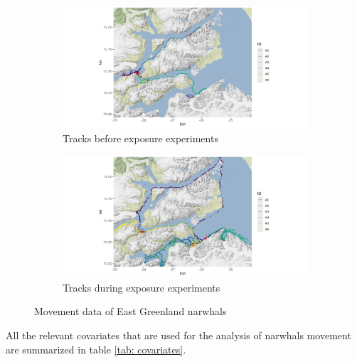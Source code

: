 \documentclass[11pt]{article}
\newcommand {\1}{\mathbb{1}}
\begin{document}
\begin{figure}[H]
	\centering
	\begin{subfigure}{0.49\textwidth}
		\centering
		\includegraphics[scale=0.38]{images/data_exploration/tracksBE1.png}
		\caption{Tracks before exposure experiments}
	\end{subfigure}
	\begin{subfigure}{0.49\textwidth}
		\centering
		\includegraphics[scale=0.38]{images/data_exploration/tracksAE.png}
		\caption{Tracks during exposure experiments}
	\end{subfigure}
	\caption{Movement data of East Greenland narwhals}
	\label{fig: tracks before and after exposure}
\end{figure}

 All the relevant covariates that are used for the analysis of narwhals movement are summarized in table \ref{tab: covariates}.
\end{document}
